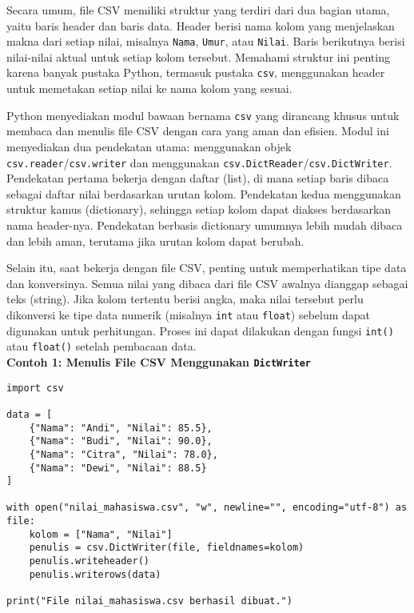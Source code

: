 Secara umum, file CSV memiliki struktur yang terdiri dari dua bagian utama, yaitu baris header dan baris data. Header berisi nama kolom yang menjelaskan makna dari setiap nilai, misalnya \texttt{Nama}, \texttt{Umur}, atau \texttt{Nilai}. Baris berikutnya berisi nilai-nilai aktual untuk setiap kolom tersebut. Memahami struktur ini penting karena banyak pustaka Python, termasuk pustaka \texttt{csv}, menggunakan header untuk memetakan setiap nilai ke nama kolom yang sesuai.

Python menyediakan modul bawaan bernama \texttt{csv} yang dirancang khusus untuk membaca dan menulis file CSV dengan cara yang aman dan efisien. Modul ini menyediakan dua pendekatan utama: menggunakan objek \texttt{csv.reader}/\texttt{csv.writer} dan menggunakan \texttt{csv.DictReader}/\texttt{csv.DictWriter}. Pendekatan pertama bekerja dengan daftar (list), di mana setiap baris dibaca sebagai daftar nilai berdasarkan urutan kolom. Pendekatan kedua menggunakan struktur kamus (dictionary), sehingga setiap kolom dapat diakses berdasarkan nama header-nya. Pendekatan berbasis dictionary umumnya lebih mudah dibaca dan lebih aman, terutama jika urutan kolom dapat berubah.

Selain itu, saat bekerja dengan file CSV, penting untuk memperhatikan tipe data dan konversinya. Semua nilai yang dibaca dari file CSV awalnya dianggap sebagai teks (string). Jika kolom tertentu berisi angka, maka nilai tersebut perlu dikonversi ke tipe data numerik (misalnya \texttt{int} atau \texttt{float}) sebelum dapat digunakan untuk perhitungan. Proses ini dapat dilakukan dengan fungsi \texttt{int()} atau \texttt{float()} setelah pembacaan data.\\

\noindent\textbf{Contoh 1: Menulis File CSV Menggunakan \texttt{DictWriter}}

\begin{lstlisting}[style=PythonStyle, caption={Menulis data ke file CSV menggunakan csv.DictWriter}]
import csv

data = [
    {"Nama": "Andi", "Nilai": 85.5},
    {"Nama": "Budi", "Nilai": 90.0},
    {"Nama": "Citra", "Nilai": 78.0},
    {"Nama": "Dewi", "Nilai": 88.5}
]

with open("nilai_mahasiswa.csv", "w", newline="", encoding="utf-8") as file:
    kolom = ["Nama", "Nilai"]
    penulis = csv.DictWriter(file, fieldnames=kolom)
    penulis.writeheader()
    penulis.writerows(data)

print("File nilai_mahasiswa.csv berhasil dibuat.")
\end{lstlisting}

